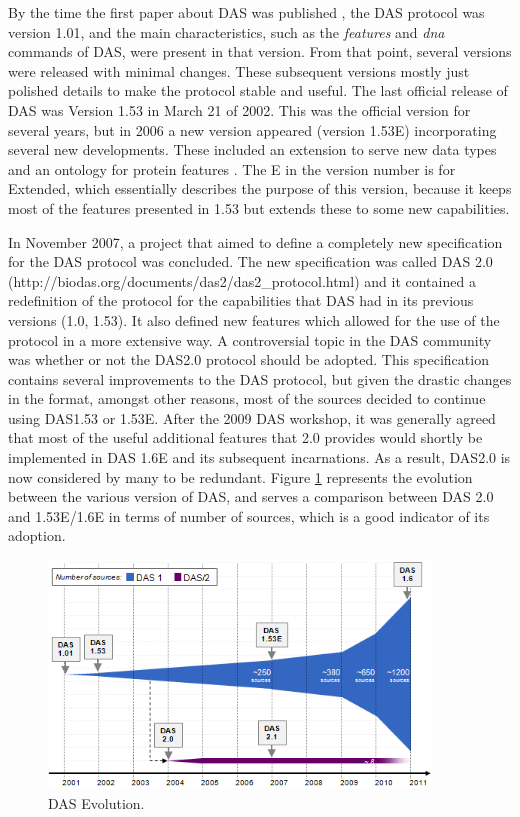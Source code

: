 By the time the first paper about DAS was published \cite{DOW2001}, the DAS protocol was version 1.01, and the main characteristics, such as the \emph{features} and \emph{dna} commands of DAS, were present in that version. From that point, several versions were released with minimal changes. These subsequent versions mostly just polished details to make the protocol stable and useful. The last official release of DAS was Version 1.53 in March 21 of 2002. This was the official version for several years, but in 2006 a new version appeared (version 1.53E) incorporating several new developments. These included an extension to serve new data types and an ontology for protein features \cite{JEN2008}. The E in the version number is for Extended, which essentially describes the purpose of this version, because it keeps most of the features presented in 1.53 but extends these to some new capabilities.

In November 2007, a project that aimed to define a completely new specification for the DAS protocol was concluded. The new specification was called DAS 2.0 (http://biodas.org/documents/das2/das2\_protocol.html) and it contained a redefinition of the protocol for the capabilities that DAS had in its previous versions (1.0, 1.53). It also defined new features which allowed for the use of the protocol in a more extensive way. A controversial topic in the DAS community was whether or not the DAS2.0 protocol should be adopted. This specification contains several improvements to the DAS protocol, but given the drastic changes in the format, amongst other reasons, most of the sources decided to continue using DAS1.53 or 1.53E. After the 2009 DAS workshop, it was generally agreed that most of the useful additional features that 2.0 provides would shortly be implemented in DAS 1.6E and its subsequent incarnations. As a result, DAS2.0 is now considered by many to be redundant. Figure \ref{fig:dasevolution} represents the evolution between the various version of DAS, and serves a comparison between DAS 2.0 and 1.53E/1.6E in terms of number of sources, which is a good indicator of its adoption.

\begin{figure}  
\centering
\includegraphics[width=4in]{figures/DasEvolution2.PNG}
\caption[DAS Evolution.]{DAS Evolution.
\label{fig:dasevolution}}
\end{figure}

